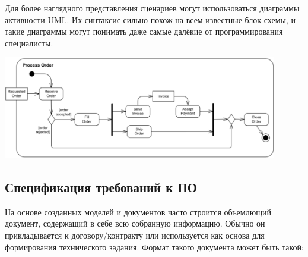 \documentclass{../../text-style}
\begin{document}
Для более наглядного представления сценариев могут использоваться диаграммы активности UML.
Их синтаксис сильно похож на всем известные блок-схемы, и такие диаграммы могут понимать даже самые далёкие от программирования специалисты.

\begin{center}
    \includegraphics[width=0.9\textwidth]{activity.png}
\end{center}

\subsection{Спецификация требований к ПО}

На основе созданных моделей и документов часто строится объемлющий документ, содержащий в себе всю собранную информацию.
Обычно он прикладывается к договору/контракту или используется как основа для формирования технического задания.
Формат такого документа может быть такой:
\end{document}
